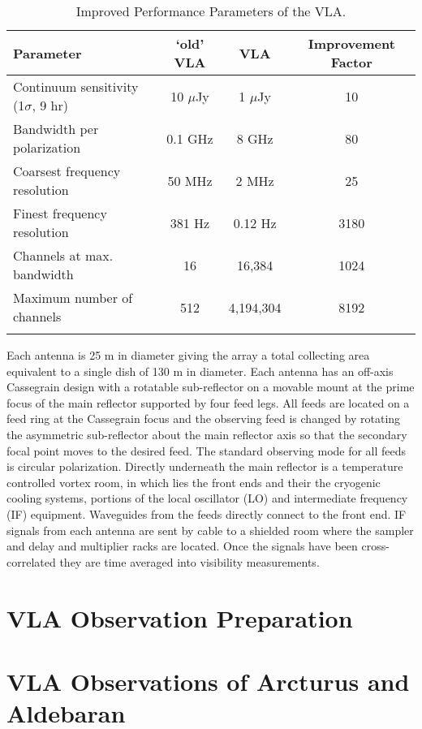\begin{table}
\begin{center}
\caption[Improved Performance Parameters of the VLA.]
{Improved Performance Parameters of the VLA.}
\begin{tabular}{lccc}
\hline
\hline
\rule{0pt}{2.5ex}Parameter & `old' VLA & VLA & Improvement Factor \\
\hline
\rule{0pt}{2.5ex}Continuum sensitivity (1$\sigma$, 9 hr) & 10 $\mu$Jy & 1 $\mu$Jy& 10\\
Bandwidth per polarization & 0.1 GHz & 8 GHz & 80\\ 
Coarsest frequency resolution & 50 MHz & 2 MHz & 25\\ 
Finest frequency resolution & 381 Hz & 0.12 Hz & 3180\\ 
Channels at max. bandwidth & 16 & 16,384 & 1024\\ 
Maximum number of channels & 512 & 4,194,304 & 8192\\ 
\hline
\rule{0pt}{2.5ex}
\end{tabular}
\label{tab:3.1}
\end{center}
\end{table}

Each antenna is 25 m in diameter giving the array a total collecting area equivalent to a single dish of 130 m in diameter. Each antenna has an off-axis Cassegrain design with a rotatable sub-reflector on a movable mount at the prime focus of the main reflector supported by four feed legs. All feeds are located on a feed ring at the Cassegrain focus and the observing feed is changed by rotating the asymmetric sub-reflector about the main reflector axis so that the secondary focal point moves to the desired feed. The standard observing mode for all feeds is circular polarization. Directly underneath the main reflector is a temperature controlled vortex room, in which lies the front ends and their the cryogenic cooling systems, portions of the local oscillator (LO) and intermediate frequency (IF) equipment. Waveguides from the feeds directly connect to the front end. IF signals from each antenna are sent by cable to a shielded room where the sampler and delay and multiplier racks are located. Once the signals have been cross-correlated they are time averaged into visibility measurements.
\section{VLA Observation Preparation}\label{sec:3.6}

\section{VLA Observations of Arcturus and Aldebaran}\label{sec:3.7}

